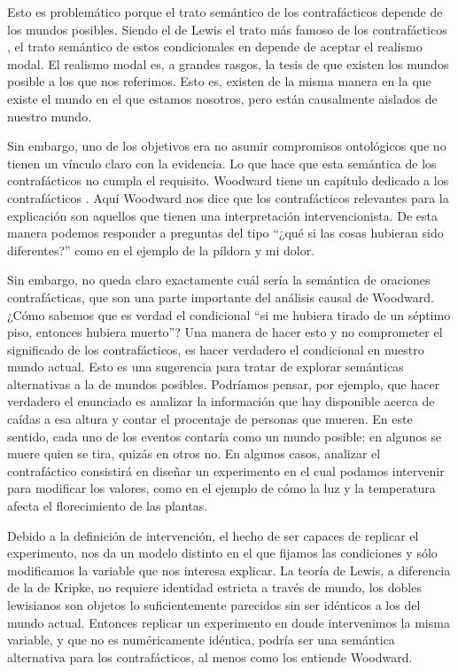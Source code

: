 Esto es problemático porque el trato semántico de los contrafácticos depende de los mundos posibles. Siendo el de Lewis el trato más famoso de los contrafácticos \citeyear{Lewis1973}, el trato semántico de estos condicionales en depende de aceptar el realismo modal. El realismo modal es, a grandes rasgos, la tesis de que existen los mundos posible a los que nos referimos. Esto es, existen de la misma manera en la que existe el mundo en el que estamos nosotros, pero están causalmente aislados de nuestro mundo.

Sin embargo, uno de los objetivos era no asumir compromisos ontológicos que no tienen un vínculo claro con la evidencia. Lo que hace que esta semántica de los contrafácticos no cumpla el requisito. Woodward tiene un capítulo dedicado a los contrafácticos \cite[cap. 5]{Woodward2003}. Aquí Woodward nos dice que los contrafácticos relevantes para la explicación son aquellos que tienen una interpretación intervencionista. De esta manera podemos responder a preguntas del tipo ``¿qué si las cosas hubieran sido diferentes?'' como en el ejemplo de la píldora y mi dolor.

Sin embargo, no queda claro exactamente cuál sería la semántica de oraciones contrafácticas, que son una parte importante del análisis causal de Woodward. ¿Cómo sabemos que es verdad el condicional ``si me hubiera tirado de un séptimo piso, entonces hubiera muerto''? Una manera de hacer esto y no comprometer el significado de los contrafácticos, es hacer verdadero el condicional en nuestro mundo actual. Esto es una sugerencia para tratar de explorar semánticas alternativas a la de mundos posibles. Podríamos pensar, por ejemplo, que hacer verdadero el enunciado es analizar la información que hay disponible acerca de caídas a esa altura y contar el procentaje de personas que mueren. En este sentido, cada uno de los eventos contaría como un mundo posible: en algunos se muere quien se tira, quizás en otros no. En algunos casos, analizar el contrafáctico consistirá en diseñar un experimento en el cual podamos intervenir para modificar los valores, como en el ejemplo de cómo la luz y la temperatura afecta el florecimiento de las plantas.

Debido a la definición de intervención, el hecho de ser capaces de replicar el experimento, nos da un modelo distinto en el que fijamos las condiciones y sólo modificamos la variable que nos interesa explicar. La teoría de Lewis, a diferencia de la de Kripke, no requiere identidad estricta a través de mundo, los dobles lewisianos son objetos lo suficientemente parecidos sin ser idénticos a los del mundo actual. Entonces replicar un experimento en donde intervenimos la misma variable, y que no es numéricamente idéntica, podría ser una semántica alternativa para los contrafácticos, al menos como los entiende Woodward.

